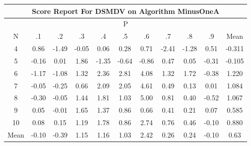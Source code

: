 \documentclass[11pt,a4paper]{report}
\begin{document}
\begin{longtable}{ | c || c | c | c | c | c | c | c | c | c || c |}
\hline
\multicolumn{11}{|c|}{ Score Report For DSMDV on Algorithm MinusOneA} \\
\hline
\multicolumn{11}{|c|}{ P } \\
\hline
N & .1 & .2 & .3 & .4 & .5 & .6 & .7 & .8 & .9 & Mean\\
 \hline
 \hline
 \endhead
  4 &  \cellcolor[HTML]{E7E7FF} 0.86 &  \cellcolor[HTML]{FFD7D7} -1.49 &  \cellcolor[HTML]{FFFFFF} -0.05 &  \cellcolor[HTML]{FFFFFF} 0.06 &  \cellcolor[HTML]{F7F7FF} 0.28 &  \cellcolor[HTML]{EFEFFF} 0.71 &  \cellcolor[HTML]{FFBFBF} -2.41 &  \cellcolor[HTML]{FFDFDF} -1.28 &  \cellcolor[HTML]{EFEFFF} 0.51 & -0.311 \\
  5 &  \cellcolor[HTML]{FFF7F7} -0.16 &  \cellcolor[HTML]{FFFFFF} 0.01 &  \cellcolor[HTML]{CFCFFF} 1.86 &  \cellcolor[HTML]{FFDFDF} -1.35 &  \cellcolor[HTML]{FFEFEF} -0.64 &  \cellcolor[HTML]{FFE7E7} -0.86 &  \cellcolor[HTML]{F7F7FF} 0.47 &  \cellcolor[HTML]{FFFFFF} 0.05 &  \cellcolor[HTML]{FFF7F7} -0.31 & -0.105 \\
  6 &  \cellcolor[HTML]{FFDFDF} -1.17 &  \cellcolor[HTML]{FFE7E7} -1.08 &  \cellcolor[HTML]{DFDFFF} 1.32 &  \cellcolor[HTML]{C7C7FF} 2.36 &  \cellcolor[HTML]{B7B7FF} 2.81 &  \cellcolor[HTML]{9797FF} 4.08 &  \cellcolor[HTML]{DFDFFF} 1.32 &  \cellcolor[HTML]{D7D7FF} 1.72 &  \cellcolor[HTML]{FFF7F7} -0.38 & 1.220 \\
  7 &  \cellcolor[HTML]{FFFFFF} -0.05 &  \cellcolor[HTML]{FFF7F7} -0.25 &  \cellcolor[HTML]{EFEFFF} 0.66 &  \cellcolor[HTML]{C7C7FF} 2.09 &  \cellcolor[HTML]{CFCFFF} 2.05 &  \cellcolor[HTML]{8787FF} 4.61 &  \cellcolor[HTML]{EFEFFF} 0.49 &  \cellcolor[HTML]{FFFFFF} 0.13 &  \cellcolor[HTML]{FFFFFF} 0.01 & 1.084 \\
  8 &  \cellcolor[HTML]{FFF7F7} -0.30 &  \cellcolor[HTML]{FFFFFF} -0.05 &  \cellcolor[HTML]{D7D7FF} 1.44 &  \cellcolor[HTML]{CFCFFF} 1.81 &  \cellcolor[HTML]{E7E7FF} 1.03 &  \cellcolor[HTML]{8080FF} 5.00 &  \cellcolor[HTML]{E7E7FF} 0.81 &  \cellcolor[HTML]{F7F7FF} 0.40 &  \cellcolor[HTML]{FFEFEF} -0.52 & 1.067 \\
  9 &  \cellcolor[HTML]{FFFFFF} 0.05 &  \cellcolor[HTML]{FFFFFF} -0.01 &  \cellcolor[HTML]{D7D7FF} 1.65 &  \cellcolor[HTML]{DFDFFF} 1.37 &  \cellcolor[HTML]{E7E7FF} 0.86 &  \cellcolor[HTML]{EFEFFF} 0.66 &  \cellcolor[HTML]{F7F7FF} 0.41 &  \cellcolor[HTML]{F7F7FF} 0.21 &  \cellcolor[HTML]{FFFFFF} 0.07 & 0.585 \\
  10 &  \cellcolor[HTML]{FFFFFF} 0.08 &  \cellcolor[HTML]{FFFFFF} 0.15 &  \cellcolor[HTML]{DFDFFF} 1.19 &  \cellcolor[HTML]{CFCFFF} 1.78 &  \cellcolor[HTML]{E7E7FF} 0.86 &  \cellcolor[HTML]{B7B7FF} 2.74 &  \cellcolor[HTML]{EFEFFF} 0.76 &  \cellcolor[HTML]{F7F7FF} 0.46 &  \cellcolor[HTML]{FFFFFF} -0.10 & 0.880 \\
 \hline
 \hline
Mean &  \cellcolor[HTML]{FFFFFF} -0.10 &  \cellcolor[HTML]{FFF7F7} -0.39 &  \cellcolor[HTML]{DFDFFF} 1.15 &  \cellcolor[HTML]{DFDFFF} 1.16 &  \cellcolor[HTML]{E7E7FF} 1.03 &  \cellcolor[HTML]{BFBFFF} 2.42 &  \cellcolor[HTML]{F7F7FF} 0.26 &  \cellcolor[HTML]{F7F7FF} 0.24 &  \cellcolor[HTML]{FFFFFF} -0.10 &  \cellcolor[HTML]{EFEFFF} 0.63
\end{longtable}
\end{document}
